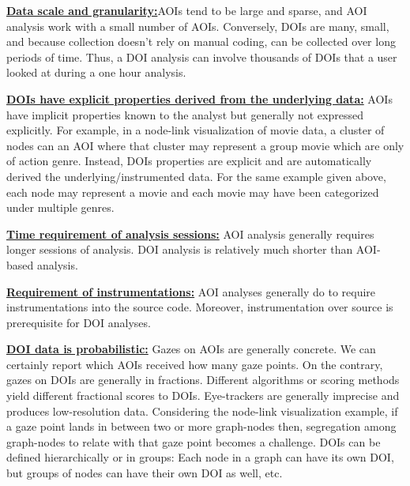 \textbf{\underline{Data scale and granularity:}}AOIs tend to be large and sparse, and AOI analysis work with a small number of AOIs. Conversely, DOIs are many, small, and because collection doesn't rely on manual coding, can be collected over long periods of time. Thus, a DOI analysis can involve thousands of DOIs that a user looked at during a one hour analysis.

\textbf{\uline{DOIs have explicit properties derived from the underlying data:}} AOIs have implicit properties known to the analyst but generally not expressed explicitly. For example, in a node-link visualization of movie data, a cluster of nodes can an AOI where that cluster may represent a group movie which are only of action genre. Instead, DOIs properties are explicit and are automatically derived the underlying/instrumented data. For the same example given above, each node may represent a movie and each movie may have been categorized under multiple genres. 

\textbf{\underline{Time requirement of analysis sessions:}} AOI analysis generally requires longer sessions of analysis. DOI analysis is relatively much shorter than AOI-based analysis.

\textbf{\underline{Requirement of instrumentations:}} AOI analyses generally do to require instrumentations into the source code. Moreover, instrumentation over source is prerequisite for DOI analyses. 

\textbf{\underline{DOI data is probabilistic:}}  Gazes on AOIs are generally concrete. We can certainly report which AOIs received how many gaze points. On the contrary, gazes on DOIs are generally in fractions. Different algorithms or scoring methods yield different fractional scores to DOIs. Eye-trackers are generally imprecise and produces low-resolution data. Considering the node-link visualization example, if a gaze point lands in between two or more graph-nodes then, segregation among graph-nodes to relate with that gaze point becomes a challenge. 
DOIs can be defined hierarchically or in groups: Each node in a graph can have its own DOI, but groups of nodes can have their own DOI as well, etc.




